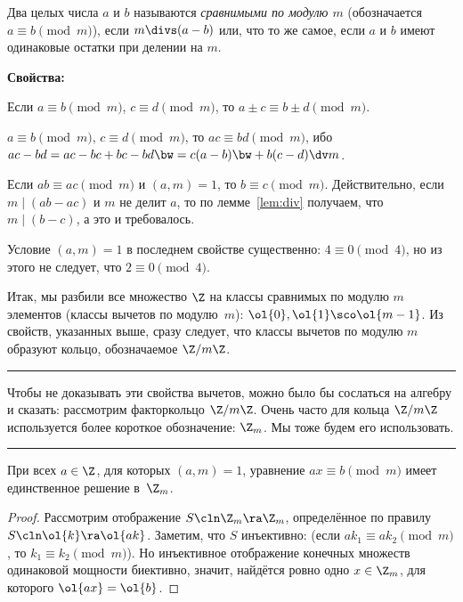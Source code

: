 \documentclass[a4paper]{article}
\newenvironment{petit}
{\par\smallskip\hrule\smallskip\footnotesize}{\par\smallskip\hrule\smallskip}
\begin{document}
\begin{df}
Два целых числа $a$ и $b$ называются \emph{сравнимыми по модулю $m$} (обозначается $a\equiv b \pmod{m}$), если
$m\divs(a-b)$ или, что то же самое, если $a$ и $b$ имеют одинаковые остатки при делении на $m$.
\end{df}

\textbf{Свойства:}
\begin{nums}{-2}
\item Если $a\equiv b\pmod{m}$, $c\equiv d\pmod{m}$, то $a\pm c\equiv b\pm d\pmod{m}$.
\item $a\equiv b\pmod{m}$, $c\equiv d\pmod{m}$, то $ac\equiv bd\pmod{m}$, ибо $ac-bd=ac-bc+bc-bd\bw=c(a-b)\bw+b(c-d)\dv m$.
\item Если $ab\equiv ac\pmod{m}$ и $(a,m)=1$, то $b\equiv c\pmod{m}$. Действительно, если
      $m\mid(ab-ac)$ и $m$ не делит $a$, то по лемме~\ref{lem:div} получаем, что $m\mid(b-c)$, а это и требовалось.
\end{nums}

\begin{note}
Условие $(a,m)=1$ в последнем свойстве существенно: $4\equiv 0\pmod{4}$, но из этого не следует, что $2\equiv 0\pmod{4}$.
\end{note}

Итак, мы разбили все множество $\Z$ на классы сравнимых по модулю $m$ элементов (классы вычетов по модулю~$m$):
$\ol{0},\ol{1}\sco \ol{m-1}$. Из свойств, указанных выше, сразу следует, что классы вычетов по модулю $m$ образуют кольцо,
обозначаемое $\Z/m\Z$.

\begin{petit}
Чтобы не доказывать эти свойства вычетов, можно было бы сослаться на алгебру и сказать: рассмотрим факторкольцо $\Z/m\Z$.
Очень часто для кольца $\Z/m\Z$ используется более короткое обозначение: $\Z_m$. Мы тоже будем его использовать.
\end{petit}

\begin{lemma}
    При всех $a\in\Z$, для которых $(a,m)=1$, уравнение $ax\equiv b\pmod{m}$ имеет единственное решение в~$\Z_m$.
\end{lemma}
\begin{proof}
Рассмотрим отображение $S\cln \Z_m \ra \Z_m$, определённое по правилу $S\cln\ol{k}\ra \ol{ak}$.
Заметим, что $S$ инъективно: (если $ak_1\equiv ak_2\pmod{m}$, то $k_1\equiv k_2\pmod{m}$).
Но инъективное отображение конечных множеств одинаковой мощности биективно, значит, найдётся ровно одно $x\in \Z_m$, для которого $\ol{ax} = \ol{b}$.
\end{proof}
\end{document}
